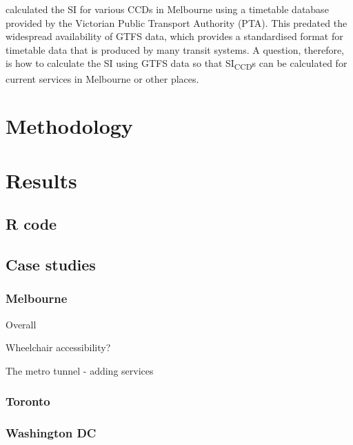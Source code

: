 \documentclass[numbered]{trbunofficial}
\begin{document}
\citet{currie2007identifying} calculated the SI for various CCDs in
Melbourne using a timetable database provided by the Victorian Public
Transport Authority (PTA). This predated the widespread availability of
GTFS data, which provides a standardised format for timetable data that
is produced by many transit systems. A question, therefore, is how to
calculate the SI using GTFS data so that SI\textsubscript{CCD}s can be
calculated for current services in Melbourne or other places.

\hypertarget{methodology}{%
\section{Methodology}\label{methodology}}

\hypertarget{results}{%
\section{Results}\label{results}}

\hypertarget{r-code}{%
\subsection{R code}\label{r-code}}

\hypertarget{case-studies}{%
\subsection{Case studies}\label{case-studies}}

\hypertarget{melbourne}{%
\subsubsection{Melbourne}\label{melbourne}}

Overall

Wheelchair accessibility?

The metro tunnel - adding services

\hypertarget{toronto}{%
\subsubsection{Toronto}\label{toronto}}

\hypertarget{washington-dc}{%
\subsubsection{Washington DC}\label{washington-dc}}
\end{document}
